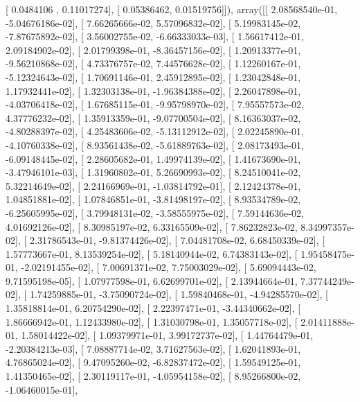 \documentclass{article}
\begin{document}
       [ 0.0484106 ,  0.11017274],
       [ 0.05386462,  0.01519756]]), array([[  2.08568540e-01,  -5.04676186e-02],
       [  7.66265666e-02,   5.57096832e-02],
       [  5.19983145e-02,  -7.87675892e-02],
       [  3.56002755e-02,  -6.66333033e-03],
       [  1.56617412e-01,   2.09184902e-02],
       [  2.01799398e-01,  -8.36457156e-02],
       [  1.20913377e-01,  -9.56210868e-02],
       [  4.73376757e-02,   7.44576628e-02],
       [  1.12260167e-01,  -5.12324643e-02],
       [  1.70691146e-01,   2.45912895e-02],
       [  1.23042848e-01,   1.17932441e-02],
       [  1.32303138e-01,  -1.96384388e-02],
       [  2.26047898e-01,  -4.03706418e-02],
       [  1.67685115e-01,  -9.95798970e-02],
       [  7.95557573e-02,   4.37776232e-02],
       [  1.35913359e-01,  -9.07700504e-02],
       [  8.16363037e-02,  -4.80288397e-02],
       [  4.25483606e-02,  -5.13112912e-02],
       [  2.02245890e-01,  -4.10760338e-02],
       [  8.93561438e-02,  -5.61889763e-02],
       [  2.08173493e-01,  -6.09148445e-02],
       [  2.28605682e-01,   1.49974139e-02],
       [  1.41673690e-01,  -3.47946101e-03],
       [  1.31960802e-01,   5.26690993e-02],
       [  8.24510041e-02,   5.32214649e-02],
       [  2.24166969e-01,  -1.03814792e-01],
       [  2.12424378e-01,   1.04851881e-02],
       [  1.07846851e-01,  -3.81498197e-02],
       [  8.93534789e-02,  -6.25605995e-02],
       [  3.79948131e-02,  -3.58555975e-02],
       [  7.59144636e-02,   4.01692126e-02],
       [  8.30985197e-02,   6.33165509e-02],
       [  7.86232823e-02,   8.34997357e-02],
       [  2.31786543e-01,  -9.81374426e-02],
       [  7.04481708e-02,   6.68450339e-02],
       [  1.57773667e-01,   8.13539254e-02],
       [  5.18140944e-02,   6.74383143e-02],
       [  1.95458475e-01,  -2.02191455e-02],
       [  7.00691371e-02,   7.75003029e-02],
       [  5.69094443e-02,   9.71595198e-05],
       [  1.07977598e-01,   6.62699701e-02],
       [  2.13944664e-01,   7.37744249e-02],
       [  1.74259885e-01,  -3.75090724e-02],
       [  1.59840468e-01,  -4.94285570e-02],
       [  1.35818814e-01,   6.20754290e-02],
       [  2.22397471e-01,  -3.44340662e-02],
       [  1.86666942e-01,   1.12433980e-02],
       [  1.31030798e-01,   1.35057718e-02],
       [  2.01411888e-01,   1.58014422e-02],
       [  1.09379971e-01,   3.99172737e-02],
       [  1.44764479e-01,  -2.20384213e-03],
       [  7.08887714e-02,   3.71627563e-02],
       [  1.62041893e-01,   4.76865024e-02],
       [  9.47095260e-02,  -6.82837472e-02],
       [  1.59549125e-01,   1.41350465e-02],
       [  2.30119117e-01,  -4.05954158e-02],
       [  8.95266800e-02,  -1.06460015e-01],
\end{document}
